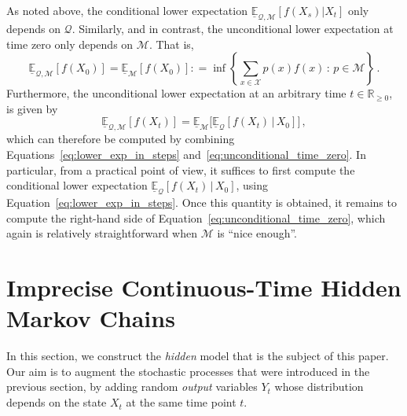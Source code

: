 \documentclass[twoside,11pt]{article}
\newcommand{\reals}{\mathbb{R}}
\newcommand{\realsnonneg}{\reals_{\geq 0}}
\newcommand{\states}{\mathcal{X}}
\newcommand{\lexp}{\underline{\mathbb{E}}_{\rateset,\mathcal{M}}}
\newcommand{\rateset}{\mathcal{Q}}
\newcommand{\coloneqq}{:\!=}
\begin{document}
As noted above, the conditional lower expectation $\lexp[f(X_s)\vert X_t]$ only depends on $\rateset$. Similarly, and in contrast, the unconditional lower expectation at time zero only depends on $\mathcal{M}$. That is,
\begin{equation}\label{eq:unconditional_time_zero}
\lexp[f(X_0)] = \underline{\mathbb{E}}_{\mathcal{M}}[f(X_0)] \coloneqq \inf\left\{ \sum_{x\in\states}p(x)f(x)\,:\,p\in\mathcal{M} \right\}\,.
\end{equation}
Furthermore, the unconditional lower expectation at an arbitrary time $t\in\realsnonneg$, is given by
\begin{equation}\label{eq:unconditional_lower_exp}
\underline{\mathbb{E}}_{\rateset,\mathcal{M}}[f(X_t)] = \underline{\mathbb{E}}_{\mathcal{M}}\bigl[\underline{\mathbb{E}}_{\rateset}[f(X_t)\,\vert\,X_0]\bigr]\,,
\end{equation}
which can therefore be computed by combining Equations~\eqref{eq:lower_exp_in_steps} and~\eqref{eq:unconditional_time_zero}. In particular, from a practical point of view, it suffices to first compute the conditional lower expectation $\underline{\mathbb{E}}_{\rateset}[f(X_t)\,\vert\,X_0]$, using Equation~\eqref{eq:lower_exp_in_steps}. Once this quantity is obtained, it remains to compute the right-hand side of Equation~\eqref{eq:unconditional_time_zero}, which again is relatively straightforward when $\mathcal{M}$ is ``nice enough''.

\section{Imprecise Continuous-Time Hidden Markov Chains}\label{sec:icthmc}

In this section, we construct the \emph{hidden} model that is the subject of this paper. Our aim is to augment the stochastic processes that were introduced in the previous section, by adding random \emph{output} variables $Y_t$ whose distribution depends on the state $X_t$ at the same time point $t$.

\end{document}
